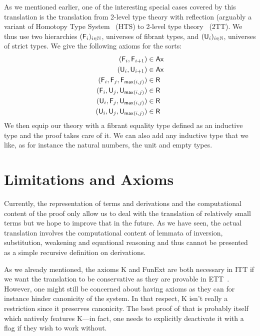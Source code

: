 
As we mentioned earlier, one of the interesting special cases covered by this
translation is the translation from 2-level type theory with reflection
(arguably a variant of Homotopy Type System~ (HTS) to 2-level
type theory~ (2TT).
%
We thus use two hierarchies $(\mathsf{F}_{i})_{i \in \mathbb{N}}$, universes of fibrant
types, and $(\mathsf{U}_{i})_{i \in \mathbb{N}}$, universes of strict types.
We give the following axioms for the sorts:
%
\begin{align*}
  (\mathsf{F}_{i}, \mathsf{F}_{i+1}) &\in \mathsf{Ax} \\
  (\mathsf{U}_{i}, \mathsf{U}_{i+1}) &\in \mathsf{Ax} \\
  (\mathsf{F}_{i}, \mathsf{F}_{j}, \mathsf{F}_{\mathsf{max}(i,j)}) &\in \mathsf{R} \\
  (\mathsf{F}_{i}, \mathsf{U}_{j}, \mathsf{U}_{\mathsf{max}(i,j)}) &\in \mathsf{R} \\
  (\mathsf{U}_{i}, \mathsf{F}_{j}, \mathsf{U}_{\mathsf{max}(i,j)}) &\in \mathsf{R} \\
  (\mathsf{U}_{i}, \mathsf{U}_{j}, \mathsf{U}_{\mathsf{max}(i,j)}) &\in \mathsf{R}
\end{align*}
%
We then equip our theory with a fibrant equality type defined as an inductive
type and the proof takes care of it. We can also add any inductive type that we
like, as for instance the natural numbers, the unit and empty types.

\section{Limitations and Axioms}
\label{sec:axioms}

Currently, the representation of terms and derivations and the
computational content of the proof only allow us to deal with the
translation of relatively small terms but we hope to improve that in
the future. As we have seen, the actual translation involves the
computational content of lemmata of inversion, substitution, weakening
and equational reasoning and thus cannot be presented as a simple
recursive definition on derivations.


As we already mentioned, the axioms K and FunExt are both
necessary in ITT if we want the translation to be conservative as they are
provable in ETT~.
However, one might still be concerned about having axioms
as they can for instance hinder canonicity of the system.
In that respect, K isn't really a restriction since it preserves canonicity.
The best proof of that is probably \Agda itself which natively features K---in
fact, one needs to explicitly deactivate it with a flag if they wish to work
without.

